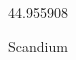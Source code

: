 \documentclass[12pt]{article}
\begin{document}
\hfill{}
\vfill
\begin{center}
  {\fontsize{50}{60}
  }

  44.955908

Scandium
\end{center}
\vfill
\end{document}
